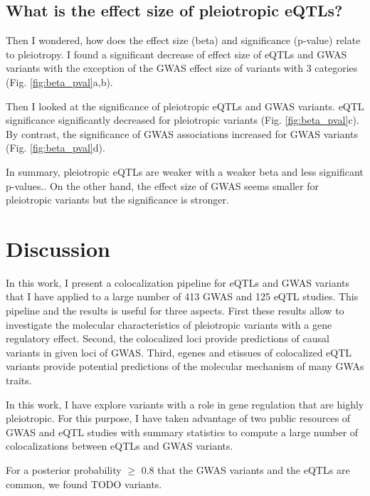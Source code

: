 \subsection*{What is the effect size of pleiotropic eQTLs?}

Then I wondered, how does the effect size (beta) and significance (p-value) relate to pleiotropy.
%
I found a significant decrease of effect size of eQTLs and GWAS variants with the exception of the GWAS effect size of variants with 3 categories (Fig. \ref{fig:beta_pval}a,b).

Then I looked at the significance of pleiotropic eQTLs and GWAS variants.
%
eQTL significance significantly decreased for pleiotropic variants (Fig. \ref{fig:beta_pval}c).
%
By contrast, the significance of GWAS associations increased for GWAS variants (Fig. \ref{fig:beta_pval}d).

In summary, pleiotropic eQTLs are weaker with a weaker beta and less significant p-values..
%
On the other hand, the effect size of GWAS seems smaller for pleiotropic variants but the significance is stronger.

\section*{Discussion}

In this work, I present a colocalization pipeline for eQTLs and GWAS variants that I have applied to a large number of 413 GWAS and 125 eQTL studies.
%
This pipeline and the results is useful for three aspects.
%
First these results allow to investigate the molecular characteristics of pleiotropic variants with a gene regulatory effect.
%
Second, the colocalized loci provide predictions of causal variants in given loci of GWAS.
%
Third, egenes and etissues of colocalized eQTL variants provide potential predictions of the molecular mechanism of many GWAs traits.

In this work, I have explore variants with a role in gene regulation that are highly pleiotropic.
%
For this purpose, I have taken advantage of two public resources of GWAS and eQTL studies with summary statistics to compute a large number of colocalizations between eQTLs and GWAS variants.

For a posterior probability $\ge$ 0.8 that the GWAS variants and the eQTLs are common, we found TODO variants.




